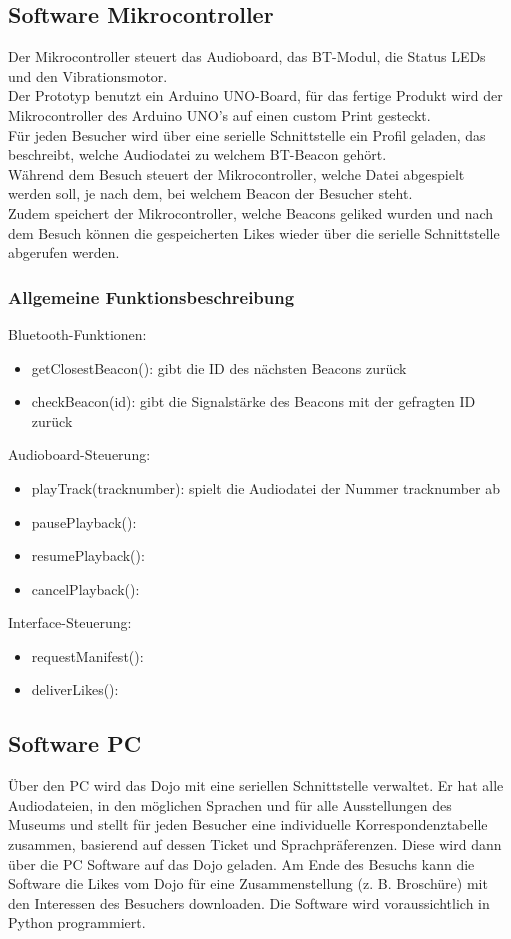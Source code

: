 \subsection{Software Mikrocontroller}
Der Mikrocontroller steuert das Audioboard, das BT-Modul, die Status LEDs und den Vibrationsmotor.\\[0.5cm]
Der Prototyp benutzt ein Arduino UNO-Board, für das fertige Produkt wird der Mikrocontroller des Arduino UNO's auf einen custom Print gesteckt.
\\[0.5cm]
Für jeden Besucher wird über eine serielle Schnittstelle ein Profil geladen, das beschreibt, welche Audiodatei zu welchem BT-Beacon gehört. \\
Während dem Besuch steuert der Mikrocontroller, welche Datei abgespielt werden soll, je nach dem, bei welchem Beacon der Besucher steht.\\
Zudem speichert der Mikrocontroller, welche Beacons geliked wurden und nach dem Besuch können die gespeicherten Likes wieder über die serielle Schnittstelle abgerufen werden.\\
\newpage
\subsubsection{Allgemeine Funktionsbeschreibung}
Bluetooth-Funktionen:
\begin{itemize}
	\item getClosestBeacon(): gibt die ID des nächsten Beacons zurück
	\item checkBeacon(id): gibt die Signalstärke des Beacons mit der gefragten ID zurück
\end{itemize}
\vspace*{0.2cm}
Audioboard-Steuerung:
\begin{itemize}
	\item playTrack(tracknumber): spielt die Audiodatei der Nummer tracknumber ab
	\item pausePlayback():
	\item resumePlayback():
	\item cancelPlayback():
\end{itemize}
\vspace*{0.2cm}
Interface-Steuerung:
\begin{itemize}
	\item requestManifest():
	\item deliverLikes():
\end{itemize}

\subsection{Software PC}
Über den PC wird das Dojo mit eine seriellen Schnittstelle verwaltet. Er hat alle Audiodateien, in den möglichen Sprachen und für alle Ausstellungen des Museums und stellt für jeden Besucher eine individuelle Korrespondenztabelle zusammen, basierend auf dessen Ticket und Sprachpräferenzen. Diese wird dann über die PC Software auf das Dojo geladen. Am Ende des Besuchs kann die Software die Likes vom Dojo für eine Zusammenstellung (z. B. Broschüre) mit den Interessen des Besuchers downloaden. Die Software wird voraussichtlich in Python programmiert.\\
\newpage
